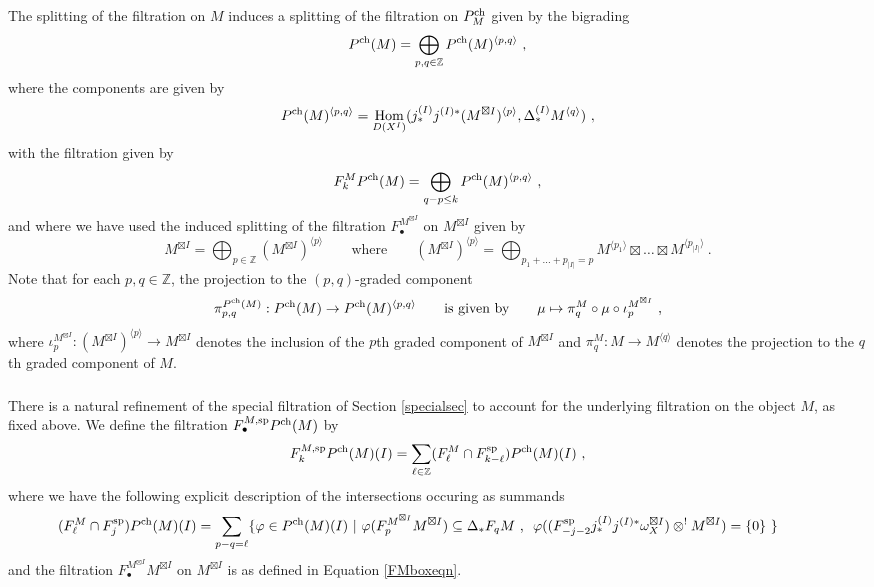 \documentclass[11pt]{amsart}
\numberwithin{equation}{section}
\theoremstyle{definition}
\newcommand{\bb}{\mathbb}
\newcommand{\spe}{{\textup{sp}}}
\DeclareMathOperator{\Hom}{Hom}
\newcommand{\ch}{{\textup{ch}}}
\newcommand{\0}{{\textbf{0}}}
\newcommand{\DD}{{D}}
\newcommand{\Z}{\bb Z}
\def\ch{{\rm ch}}
\begin{document}
The splitting of the filtration on $M$ induces a splitting of the filtration on $P^{\ch}_M$ given by the bigrading
\[
	 P^\ch(M) = \bigoplus_{p,q \in \Z} P^\ch(M)^{\langle p,q \rangle }~,
\]
where the components are given by
\begin{equation}\label{PchMpqeqn}
	 P^\ch(M)^{\langle p,q \rangle } = \Hom_{\DD(X^I)}(j^{(I)}_*j^{(I)*}(M^{\boxtimes I})^{\langle p \rangle}, \Delta^{(I)}_*M^{\langle q \rangle}) \ ,
\end{equation}
with the filtration given by
\[ 
F_k^MP^\ch(M) = \bigoplus_{q-p\leq k}  P^\ch(M)^{\langle p,q \rangle } \ , 
\]
and where we have used the induced splitting of the filtration $F_\bullet^{M^{\boxtimes I}}$ on $M^{\boxtimes I}$ given by
\[
M^{\boxtimes I} = \bigoplus_{p\in \Z} (M^{\boxtimes I})^{\langle p \rangle} \qquad \text{where}\qquad (M^{\boxtimes I})^{\langle p \rangle}= \bigoplus_{p_1+...+p_{|I|} = p}  M^{\langle p_1 \rangle} \boxtimes \hdots \boxtimes M^{\langle p_{|I|} \rangle} \ . 
\]
Note that for each $p,q\in \Z$, the projection to the $(p,q)$-graded component
\begin{equation}\label{pipqeqn}
	 \pi_{p,q}^{P^\ch(M)}:P^\ch(M) \to P^\ch(M)^{\langle p,q \rangle } \qquad \text{is given by}\qquad \mu \mapsto \pi_q^M \circ \mu \circ \iota_p^{M^{\boxtimes I}}  \ ,
\end{equation}
where $\iota_p^{M^{\boxtimes I}}:(M^{\boxtimes I})^{\langle p \rangle}  \to M^{\boxtimes I}$ denotes the inclusion of the $p$th graded component of $M^{\boxtimes I}$ and $\pi_q^M:M \to M^{\langle q \rangle} $ denotes the projection to the $q$th graded component of $M$.


\subsubsection{} 

There is a natural refinement of the special filtration of Section \ref{specialsec} to account for the underlying filtration on the object $M$, as fixed above. We define the filtration $F_\bullet^{M,\spe} P^\ch(M)$ by
\begin{equation}
F_k^{M,\spe} P^\ch(M)(I)= \sum_{\ell \in \Z} (F_{\ell}^{M} \cap F^\spe_{k-\ell} )P^\ch(M)(I) \ ,
\end{equation}
where we have the following explicit description of the intersections occuring as summands
\[
{\hspace{-1cm}}
(F_{\ell}^{M}\cap F_j^{\spe}) P^\ch(M)(I) = \sum_{p-q=\ell} \{ \varphi \in  P^\ch(M)(I) \ | \   \varphi( F_{p}^{M^{\boxtimes I}} M^{\boxtimes I}) \subseteq \Delta_* F_{q}M  \text{ , } \ \varphi((F_{-j-2}^\spe j^{(I)}_*j^{(I)*}\omega_{X}^{\boxtimes I}) \otimes^! M^{\boxtimes I})=\{0\}  \ \}
\]
and the filtration $F_\bullet^{M^{\boxtimes I}}M^{\boxtimes I}$ on $M^{\boxtimes I}$ is as defined in Equation \ref{FMboxeqn}.
\end{document}
